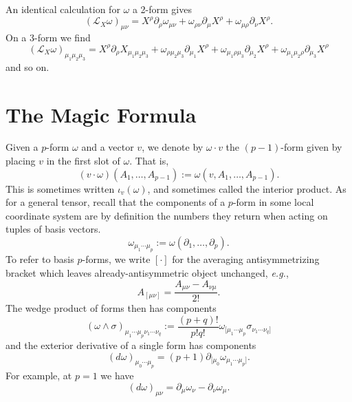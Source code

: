 \documentclass[11pt,letterpaper]{article}
\newcommand{\LP}{\left(}
\newcommand{\RP}{\right)}
\newcommand{\mc}[1]{\mathcal{#1}}
\newcommand{\D}{\partial}
\begin{document}
An identical calculation for $\omega$ a 2-form gives \begin{equation}
\LP \mc{L}_X \omega \RP_{\mu \nu} = X^\rho \D_\rho \omega_{\mu \nu} + \omega_{\rho \nu} \D_\mu X^\rho + \omega_{\mu \rho} \D_\nu X^\rho.
\end{equation}
On a 3-form we find \begin{equation}
\LP \mc{L}_X \omega \RP_{\mu_1 \mu_2 \mu_3} = X^\rho \D_\rho X_{\mu_1 \mu_2 \mu_3} + \omega_{\rho \mu_2 \mu_3} \D_{\mu_1} X^\rho + \omega_{\mu_1 \rho \mu_3} \D_{\mu_2} X^\rho + \omega_{\mu_1 \mu_2 \rho} \D_{\mu_3} X^\rho
\end{equation}
and so on.


\section{The Magic Formula}
Given a $p$-form $\omega$ and a vector $v$, we denote by $\omega \cdot v$ the $(p-1)$-form given by placing $v$ in the first slot of $\omega$. That is, \begin{equation}
(v \cdot \omega)(A_1, \ldots, A_{p-1} ) := \omega(v, A_1, \ldots, A_{p-1} ).
\end{equation}
This is sometimes written $\iota_v(\omega)$, and sometimes called the interior product. As for a general tensor, recall that the components of a $p$-form in some local coordinate system are by definition the numbers they return when acting on tuples of basis vectors. \begin{equation}
\omega_{\mu_1 \cdots \mu_p} := \omega(\D_1, \ldots, \D_p).
\end{equation}
To refer to basis $p$-forms, we write $[ \cdot ]$ for the averaging antisymmetrizing bracket which leaves already-antisymmetric object unchanged, \textit{e.g.}, \begin{equation}
A_{[\mu \nu]} = \frac{A_{\mu \nu} - A_{\nu \mu}}{2!}.
\end{equation}
The wedge product of forms then has components \begin{equation}
(\omega \wedge\sigma)_{\mu_1 \cdots \mu_p \nu_1 \cdots \nu_q} := \frac{(p+q)!}{p! q!} \omega_{[\mu_1 \cdots \mu_p} \sigma_{\nu_1 \cdots \nu_q]}
\end{equation}
and the exterior derivative of a single form has components \begin{equation}
(d \omega)_{\mu_0 \cdots \mu_p} = (p+1)\D_{[\mu_0} \omega_{\mu_1 \cdots \mu_p]}.
\end{equation}
For example, at $p = 1$ we have \begin{equation}
(d \omega)_{\mu \nu} = \D_\mu \omega_\nu - \D_\nu \omega_\mu.
\end{equation}
\end{document}
